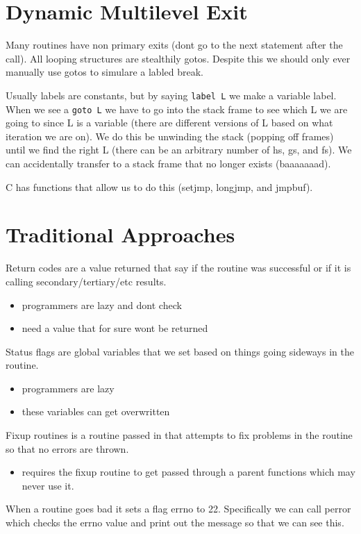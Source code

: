 \documentclass{article}
\begin{document}
\section{Dynamic Multilevel Exit}
Many routines have non primary exits (dont go to the next statement after the call). All looping structures are stealthily gotos. Despite this we should only ever manually use gotos to simulare a labled break.

Usually labels are constants, but by saying \texttt{label L} we make a variable label. When we see a \texttt{goto L} we have to go into the stack frame to see which L we are going to since L is a variable (there are different versions of L based on what iteration we are on). We do this be unwinding the stack (popping off frames) until we find the right L (there can be an arbitrary number of hs, gs, and fs). We can accidentally transfer to a stack frame that no longer exists (baaaaaaad).

C has functions that allow us to do this (setjmp, longjmp, and jmpbuf).

\section{Traditional Approaches}
Return codes are a value returned that say if the routine was successful or if it is calling secondary/tertiary/etc results.
    \begin{itemize}
        \item programmers are lazy and dont check
        \item need a value that for sure wont be returned
    \end{itemize}

Status flags are global variables that we set based on things going sideways in the routine.
\begin{itemize}
    \item programmers are lazy
    \item these variables can get overwritten
\end{itemize}

Fixup routines is a routine passed in that attempts to fix problems in the routine so that no errors are thrown.
\begin{itemize}
    \item requires the fixup routine to get passed through a parent functions which may never use it.
\end{itemize}

When a routine goes bad it sets a flag errno to 22. Specifically we can call perror which checks the errno value and print out the message so that we can see this.
\end{document}
